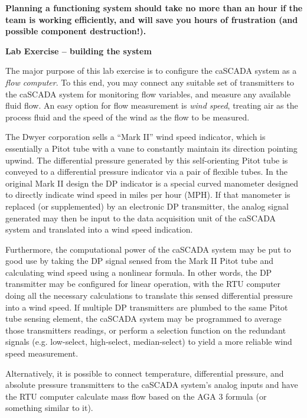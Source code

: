 \vskip 10pt

{\bf Planning a functioning system should take no more than an hour if the team is working efficiently, and will save you hours of frustration (and possible component destruction!).}






\vfil \eject

\noindent
{\bf Lab Exercise -- building the system}

\vskip 5pt

The major purpose of this lab exercise is to configure the caSCADA system as a {\it flow computer}.  To this end, you may connect any suitable set of transmitters to the caSCADA system for monitoring flow variables, and measure any available fluid flow.  An easy option for flow measurement is {\it wind speed}, treating air as the process fluid and the speed of the wind as the flow to be measured.

\vskip 10pt

The Dwyer corporation sells a ``Mark II'' wind speed indicator, which is essentially a Pitot tube with a vane to constantly maintain its direction pointing upwind.  The differential pressure generated by this self-orienting Pitot tube is conveyed to a differential pressure indicator via a pair of flexible tubes.  In the original Mark II design the DP indicator is a special curved manometer designed to directly indicate wind speed in miles per hour (MPH).  If that manometer is replaced (or supplemented) by an electronic DP transmitter, the analog signal generated may then be input to the data acquisition unit of the caSCADA system and translated into a wind speed indication.

Furthermore, the computational power of the caSCADA system may be put to good use by taking the DP signal sensed from the Mark II Pitot tube and calculating wind speed using a nonlinear formula.  In other words, the DP transmitter may be configured for linear operation, with the RTU computer doing all the necessary calculations to translate this sensed differential pressure into a wind speed.  If multiple DP transmitters are plumbed to the same Pitot tube sensing element, the caSCADA system may be programmed to average those transmitters readings, or perform a selection function on the redundant signals (e.g. low-select, high-select, median-select) to yield a more reliable wind speed measurement.

Alternatively, it is possible to connect temperature, differential pressure, and absolute pressure transmitters to the caSCADA system's analog inputs and have the RTU computer calculate mass flow based on the AGA 3 formula (or something similar to it).

